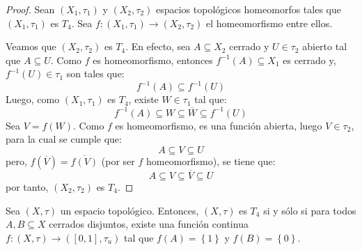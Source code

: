 \documentclass[12pt]{report}
\theoremstyle{largebreak}
\newcommand\cf[3]{\ensuremath{#1:#2\rightarrow#3}}
\newcommand{\Cls}[1]{\ensuremath{\overline{#1}}}
\begin{document}
    \begin{proof}
        Sean $(X_1,\tau_1)$ y $(X_2,\tau_2)$ espacios topológicos homeomorfos tales que $(X_1,\tau_1)$ es $T_4$. Sea $\cf{f}{(X_1,\tau_1)}{(X_2,\tau_2)}$ el homeomorfismo entre ellos.

        Veamos que $(X_2,\tau_2)$ es $T_4$. En efecto, sea $A\subseteq X_2$ cerrado y $U\in\tau_2$ abierto tal que $A\subseteq U$. Como $f$ es homeomorfismo, entonces
        $f^{-1}(A)\subseteq X_1$ es cerrado y, $f^{-1}(U)\in\tau_1$ son tales que:
        \begin{equation*}
            f^{-1}(A)\subseteq f^{-1}(U)
        \end{equation*}
        Luego, como $(X_1,\tau_1)$ es $T_4$, existe $W\in\tau_1$ tal que:
        \begin{equation*}
            f^{-1}(A)\subseteq W\subseteq\Cls{W}\subseteq f^{-1}(U)
        \end{equation*}
        Sea $V=f(W)$. Como $f$ es homeomorfismo, es una función abierta, luego $V\in\tau_2$, para la cual se cumple que:
        \begin{equation*}
            A\subseteq V\subseteq U
        \end{equation*}
        pero, $f(\Cls{V})=\Cls{f(V)}$ (por ser $f$ homeomorfismo), se tiene que:
        \begin{equation*}
            A\subseteq V\subseteq \Cls{V}\subseteq U
        \end{equation*}
        por tanto, $(X_2,\tau_2)$ es $T_4$.
    \end{proof}

    \begin{lema}
        Sea $(X,\tau)$ un espacio topológico. Entonces, $(X,\tau)$ es $T_4$ si y sólo si para todos $A,B\subseteq X$ cerrados disjuntos, existe una función continua $\cf{f}{(X,\tau)}{([0,1],\tau_u)}$ tal que $f(A)=\left\{1\right\}$ y $f(B)=\left\{0\right\}$.
    \end{lema}
\end{document}
